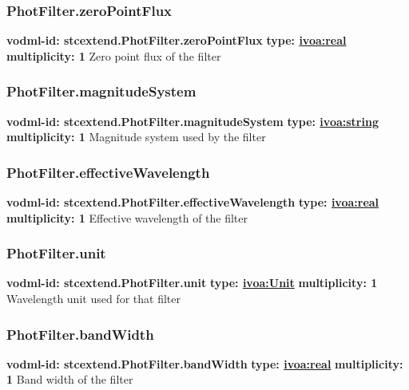     \subsubsection{PhotFilter.zeroPointFlux}
      \textbf{vodml-id: stcextend.PhotFilter.zeroPointFlux} \newline
      \textbf{type: \hyperref[sect:ivoa]{ivoa:real}} \newline
      \textbf{multiplicity: 1} \newline 
      Zero point flux of the filter

    \subsubsection{PhotFilter.magnitudeSystem}
      \textbf{vodml-id: stcextend.PhotFilter.magnitudeSystem} \newline
      \textbf{type: \hyperref[sect:ivoa]{ivoa:string}} \newline
      \textbf{multiplicity: 1} \newline 
      Magnitude system used by the filter

    \subsubsection{PhotFilter.effectiveWavelength}
      \textbf{vodml-id: stcextend.PhotFilter.effectiveWavelength} \newline
      \textbf{type: \hyperref[sect:ivoa]{ivoa:real}} \newline
      \textbf{multiplicity: 1} \newline 
      Effective wavelength of the filter

    \subsubsection{PhotFilter.unit}
      \textbf{vodml-id: stcextend.PhotFilter.unit} \newline
      \textbf{type: \hyperref[sect:ivoa]{ivoa:Unit}} \newline
      \textbf{multiplicity: 1} \newline 
      Wavelength unit used for that filter

    \subsubsection{PhotFilter.bandWidth}
      \textbf{vodml-id: stcextend.PhotFilter.bandWidth} \newline
      \textbf{type: \hyperref[sect:ivoa]{ivoa:real}} \newline
      \textbf{multiplicity: 1} \newline 
      Band width of the filter

